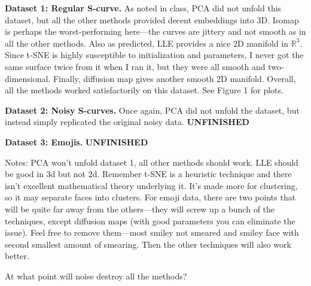 \documentclass{letter}
\newcommand{\UNFINISHED}{\textbf{\color{red} UNFINISHED}}
\newcommand{\R}{\mathbb{R}}
\begin{document}
{    \textbf{Dataset 1: Regular S-curve.} As noted in class, PCA did not unfold this dataset, but all the other methods provided decent embeddings into 3D. Isomap is perhaps the worst-performing here---the curves are jittery and not smooth as in all the other methods. Also as predicted, LLE provides a nice 2D manifold in $\R^3$. Since t-SNE is highly susceptible to initialization and parameters, I never got the same surface twice from it when I ran it, but they were all smooth and two-dimensional. Finally, diffusion map gives another smooth 2D manifold. Overall, all the methods worked satisfactorily on this dataset. See Figure 1 for plots.

    \textbf{Dataset 2: Noisy S-curves.} Once again, PCA did not unfold the dataset, but instead simply replicated the original noisy data. \UNFINISHED

    \textbf{Dataset 3: Emojis.} \UNFINISHED
    
    Notes: PCA won't unfold dataset 1, all other methods should work. LLE should be good in 3d but not 2d. Remember t-SNE is a heuristic technique and there isn't excellent mathematical theory underlying it. It's made more for clustering, so it may separate faces into clusters. For emoji data, there are two points that will be quite far away from the others---they will screw up a bunch of the techniques, except diffusion maps (with good parameters you can eliminate the issue). Feel free to remove them---most smiley not smeared and smiley face with second smallest amount of smearing. Then the other techniques will also work better.
    
    At what point will noise destroy all the methods?

}
\end{document}
